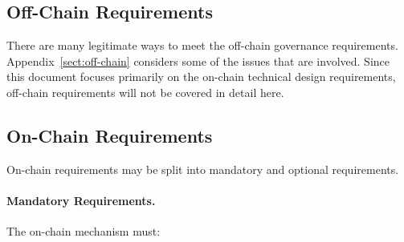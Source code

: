 \subsection{Off-Chain Requirements}

There are many legitimate ways to meet the off-chain governance requirements. Appendix~\ref{sect:off-chain} considers some of the issues
that are involved.  Since this document focuses primarily on the on-chain technical design requirements, off-chain requirements will not be covered
in detail here.

\pagebreak
\subsection{On-Chain Requirements}

On-chain requirements may be split into mandatory and optional requirements.

\paragraph{Mandatory Requirements.}  The on-chain mechanism must:

